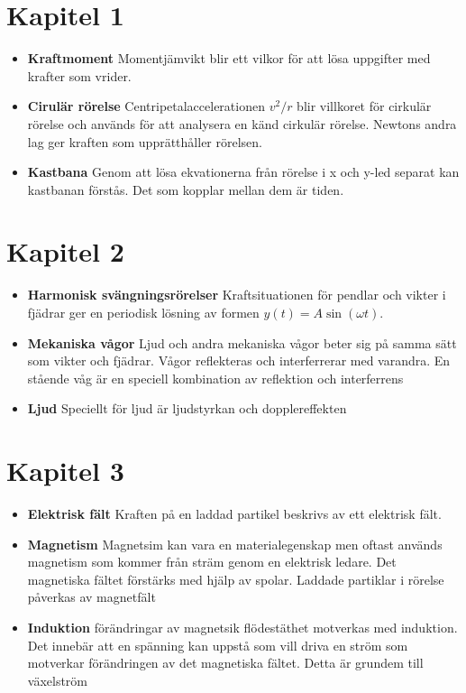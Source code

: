 \documentclass[11pt]{article}
\begin{document}
\section{Kapitel 1}
    \begin{itemize}
    \item{\textbf{Kraftmoment} Momentjämvikt blir ett vilkor för att lösa uppgifter med krafter som vrider.}

    \item{\textbf{Cirulär rörelse} Centripetalaccelerationen $v^{2}/r$ blir villkoret för cirkulär rörelse och används för att analysera en känd cirkulär rörelse. Newtons andra lag ger kraften som upprätthåller rörelsen.}

    \item{\textbf{Kastbana} Genom att lösa ekvationerna från rörelse i x och y-led separat kan kastbanan förstås. Det som kopplar mellan dem är tiden.}
    \end{itemize}
\section{Kapitel 2}
    \begin{itemize}
    \item{\textbf{Harmonisk svängningsrörelser} Kraftsituationen för pendlar och vikter i fjädrar ger en periodisk lösning av formen $y(t) = A \sin{ (\omega t)}$. }

    \item{\textbf{Mekaniska vågor} Ljud och andra mekaniska vågor beter sig på samma sätt som vikter och fjädrar. Vågor reflekteras och interferrerar med varandra. En stående våg är en speciell kombination av reflektion och interferrens}

    \item{\textbf{Ljud} Speciellt för ljud är ljudstyrkan och dopplereffekten}
    \end{itemize}
\section{Kapitel 3}
\begin{itemize}
    \item{\textbf{Elektrisk fält} Kraften på en laddad partikel beskrivs av ett elektrisk fält.}

    \item{\textbf{Magnetism} Magnetsim kan vara en materialegenskap men oftast används magnetism som kommer från sträm genom en elektrisk ledare. Det magnetiska fältet förstärks med hjälp av spolar. Laddade partiklar i rörelse påverkas av magnetfält}

    \item{\textbf{Induktion} förändringar av magnetsik flödestäthet motverkas med induktion. Det innebär att en spänning kan uppstå som vill driva en ström som motverkar förändringen av det magnetiska fältet. Detta är grundem till växelström}
\end{itemize}
\end{document}
